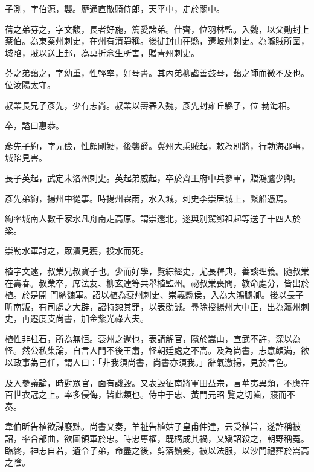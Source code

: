 \begin{pinyinscope}
 子測，字伯源，襲。歷通直散騎侍郎，天平中，走於關中。



 蒨之弟芬之，字文馥，長者好施，篤愛諸弟。仕齊，位羽林監。入魏，以父勛封上蔡伯。為東秦州刺史，在州有清靜稱。後徙封山茌縣，遷岐州刺史。為隴賊所圍，城陷，賊以送上邽，為莫折念生所害，贈青州刺史。



 芬之弟藹之，字幼重，性輕率，好琴書。其內弟柳諧善鼓琴，藹之師而微不及也。位汝陽太守。



 叔業長兄子彥先，少有志尚。叔業以壽春入魏，彥先封雍丘縣子，位
 勃海相。



 卒，謚曰惠恭。



 彥先子約，字元儉，性頗剛鯁，後襲爵。冀州大乘賊起，敕為別將，行勃海郡事，城陷見害。



 長子英起，武定末洛州刺史。英起弟威起，卒於齊王府中兵參軍，贈鴻臚少卿。



 彥先弟絢，揚州中從事。時揚州霖雨，水入城，刺史李崇居城上，繫船憑焉。



 絢率城南人數千家水凡舟南走高原。謂崇還北，遂與別駕鄭祖起等送子十四人於梁。



 崇勒水軍討之，眾潰見獲，投水而死。



 植字文遠，叔業兄叔寶子也。少而好學，覽綜經史，尤長釋典，善談理義。隨叔業在壽春。叔業卒，席法友、柳玄達等共舉植監州。祕叔業喪問，教命處分，皆出於植。於是開
 門納魏軍。詔以植為袞州刺史、崇義縣侯，入為大鴻臚卿。後以長子昕南叛，有司處之大辟，詔特恕其罪，以表勛誠。尋除授揚州大中正，出為瀛州刺史，再遷度支尚書，加金紫光祿大夫。



 植性非柱石，所為無恒。袞州之還也，表請解官，隱於嵩山，宣武不許，深以為怪。然公私集論，自言人門不後王肅，怪朝廷處之不高。及為尚書，志意頗滿，欲以政事為己任，謂人曰：「非我須尚書，尚書亦須我。」辭氣激揚，見於言色。



 及入參議論，時對眾官，面有譏毀。又表毀征南將軍田益宗，言華夷異類，不應在百世衣冠之上。率多侵侮，皆此類也。侍中于忠、黃門元昭
 覽之切齒，寢而不奏。



 韋伯昕告植欲謀廢黜。尚書又奏，羊祉告植姑子皇甫仲達，云受植旨，遂詐稱被詔，率合部曲，欲圖領軍於忠。時忠專權，既構成其禍，又矯詔殺之，朝野稱冤。臨終，神志自若，遺令子弟，命盡之後，剪落鬚髮，被以法服，以沙門禮葬於嵩高之陰。




\end{pinyinscope}
